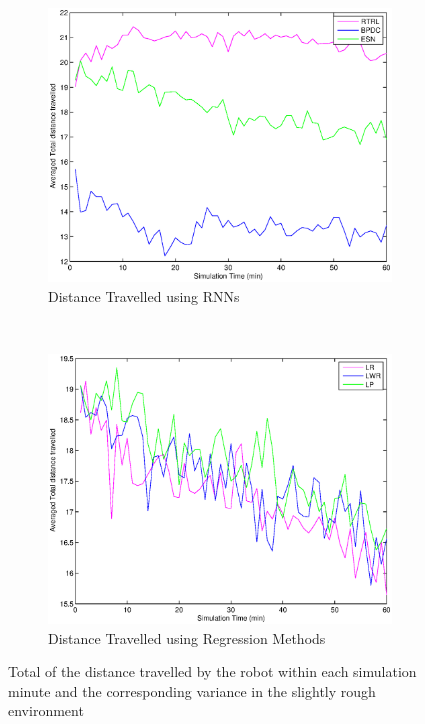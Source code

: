 \documentclass[msc,ai,logo]{infthesis}
\begin{document}
\begin{figure}[H]
        \centering
        \begin{subfigure}[b]{0.5\textwidth}
                \centering
                \includegraphics[width=\textwidth]{RNN_05_DIST.eps}
                \caption{Distance Travelled using RNNs}
              \label{fig:RNN_05_DIST}  
        \end{subfigure}%
        ~ %
        \begin{subfigure}[b]{0.5\textwidth}
                \centering
                \includegraphics[width=\textwidth]{LR_05_DIST.eps}
                \caption{Distance Travelled using Regression Methods}
               \label{fig:LR_05_DIST}  
        \end{subfigure}
        \caption{Total of the distance travelled by the robot within each simulation minute and the corresponding variance in the slightly rough environment}
          \label{fig:05_DIST}
\end{figure}
\end{document}
